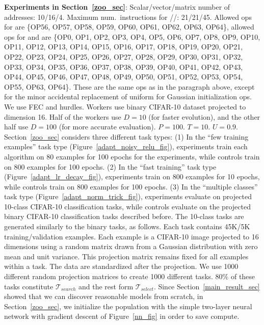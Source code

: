{\textbf{Experiments in Section~\ref{zoo_sec}}: Scalar/vector/matrix number of addresses: 10/16/4. Maximum num.\ instructions for \setup/\predict/\learn: 21/21/45. Allowed ops for \setup are \{OP56, OP57, OP58, OP59, OP60, OP61, OP62, OP63, OP64\}, allowed ops for \predict and \learn are \{OP0, OP1, OP2, OP3, OP4, OP5, OP6, OP7, OP8, OP9, OP10, OP11, OP12, OP13, OP14, OP15, OP16, OP17, OP18, OP19, OP20, OP21, OP22, OP23, OP24, OP25, OP26, OP27, OP28, OP29, OP30, OP31, OP32, OP33, OP34, OP35, OP36, OP37, OP38, OP39, OP40, OP41, OP42, OP43, OP44, OP45, OP46, OP47, OP48, OP49, OP50, OP51, OP52, OP53, OP54, OP55, OP63, OP64\}. These are the same ops as in the paragraph above, except for the minor accidental replacement of uniform for Gaussian initialization ops. We use FEC and hurdles. Workers use binary CIFAR-10 dataset projected to dimension 16. Half of the workers use $D\!\!=\!\!10$ (for faster evolution), and the other half use $D\!\!=\!\!100$ (for more accurate evaluation). $P\!\!=\!\!100$. $T\!\!=\!\!10$. $U\!\!=\!\!0.9$. Section~\ref{zoo_sec} considers three different task types: (1) In the ``few training examples'' task type (Figure~\ref{adapt_noisy_relu_fig}), experiments train each algorithm on 80 examples for 100 epochs for the experiments, while controls train on 800 examples for 100 epochs. (2) In the ``fast training'' task type (Figure~\ref{adapt_lr_decay_fig}), experiments train on 800 examples for 10 epochs, while controls train on 800 examples for 100 epochs. (3) In the ``multiple classes'' task type (Figure~\ref{adapt_norm_trick_fig}), experiments evaluate on projected 10-class CIFAR-10 %
classification tasks, while controls evaluate on the projected binary CIFAR-10 classification tasks described before. The 10-class tasks are generated similarly to the binary tasks, as follows. Each task contains 45K/5K training/validation examples. Each example is a CIFAR-10 image projected to 16 dimensions using a random matrix drawn from a Gaussian distribution with zero mean and unit variance. This projection matrix remains fixed for all examples within a task. The data are standardized after the projection. We use 1000 different random projection matrices to create 1000 different tasks. $80\%$ of these tasks constitute $\mathcal{T}_{search}$ and the rest form $\mathcal{T}_{select}$. Since Section~\ref{main_result_sec} showed that we can discover reasonable models from scratch, in Section~\ref{zoo_sec}, we initialize the population with the simple two-layer neural network with gradient descent of Figure~\ref{nn_fig} in order to save compute.

}  %

